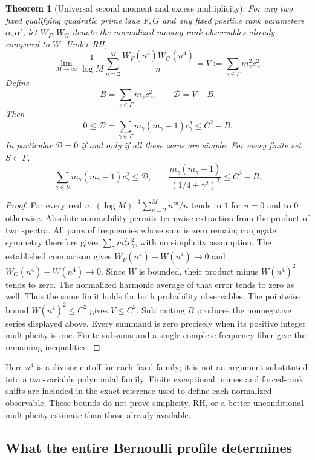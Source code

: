 \documentclass[11pt]{article}
\newtheorem{theorem}{Theorem}[section]
\theoremstyle{definition}
\begin{document}
\begin{theorem}[Universal second moment and excess multiplicity]
For any two fixed qualifying quadratic prime laws $F,G$ and any fixed
positive rank parameters $\alpha,\alpha'$, let $W_F,W_G$ denote the
normalized moving-rank observables already compared to $W$.
Under RH,
\[
 \lim_{M\to\infty}\frac1{\log M}
       \sum_{n=2}^{M}\frac{W_F(n^4)W_G(n^4)}n
   =V:=\sum_{\gamma\in\Gamma}m_\gamma^2c_\gamma^2.
\]
Define
\[
 B=\sum_{\gamma\in\Gamma}m_\gamma c_\gamma^2,\qquad
 \mathcal D=V-B.
\]
Then
\[
 0\le\mathcal D
   =\sum_{\gamma\in\Gamma}m_\gamma(m_\gamma-1)c_\gamma^2
   \le C^2-B.
\]
In particular $\mathcal D=0$ if and only if all these zeros are simple.
For every finite set $S\subset\Gamma$,
\[
 \sum_{\gamma\in S}m_\gamma(m_\gamma-1)c_\gamma^2
       \le\mathcal D,\qquad
 \frac{m_\gamma(m_\gamma-1)}{(1/4+\gamma^2)^2}
       \le C^2-B.
\]
\end{theorem}
\begin{proof}
For every real $u$,
$(\log M)^{-1}\sum_{n=2}^{M}n^{iu}/n$ tends to $1$ for $u=0$
and to $0$ otherwise. Absolute summability permits termwise extraction
from the product of two spectra. All pairs of frequencies whose sum is
zero remain; conjugate symmetry therefore gives
$\sum_\gamma m_\gamma^2c_\gamma^2$, with no simplicity assumption.
The established comparison gives
$W_F(n^4)-W(n^4)\to0$ and $W_G(n^4)-W(n^4)\to0$.
Since $W$ is bounded, their product minus $W(n^4)^2$ tends to zero.
The normalized harmonic average of that error tends to zero as well.
Thus the same limit holds for both probability observables.
The pointwise bound $W(n^4)^2\le C^2$ gives $V\le C^2$.
Subtracting $B$ produces the nonnegative series displayed above.
Every summand is zero precisely when its positive integer multiplicity
is one. Finite subsums and a single complete frequency fiber give the
remaining inequalities.
\end{proof}

Here $n^4$ is a divisor cutoff for each fixed family; it is not an
argument substituted into a two-variable polynomial family.
Finite exceptional primes and forced-rank shifts are included in the
exact reference used to define each normalized observable.
These bounds do not prove simplicity, RH, or a better unconditional
multiplicity estimate than those already available.

\clearpage
\subsection{What the entire Bernoulli profile determines}
\end{document}
